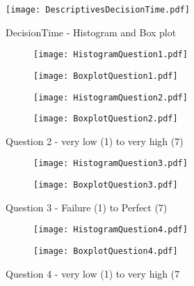 \begin{figure}[htbp] %
\begin{center} 
\texttt{[image: DescriptivesDecisionTime.pdf]}
  \caption{DecisionTime - Histogram and Box plot}
    \label{DistributionDecisionTime} 
\end{center}
\end{figure}

\begin{figure}[htbp] %
\centering
  \caption[Question 1 - Histogram and Box plot]{Question 1 - very low (1) to very high (7)}
    \label{Question1}  
\begin{subfigure} 
\centering
\texttt{[image: HistogramQuestion1.pdf]}
\end{subfigure} 
\begin{subfigure} 
\centering
\texttt{[image: BoxplotQuestion1.pdf]}
\end{subfigure}
\end{figure}
\begin{figure}[htbp] %
\begin{center} 
\begin{subfigure} 
\centering
\texttt{[image: HistogramQuestion2.pdf]}
\end{subfigure} 
\begin{subfigure} 
\centering
\texttt{[image: BoxplotQuestion2.pdf]}
\end{subfigure}
  \caption[Question 2 - Histogram and Box plot]{Question 2 - very low (1) to very high (7)}
    \label{Question2} 
\end{center}
\end{figure}
\begin{figure}[htbp] %
\begin{center} 
\begin{subfigure} 
\centering
\texttt{[image: HistogramQuestion3.pdf]}
\end{subfigure} 
\begin{subfigure} 
\centering
\texttt{[image: BoxplotQuestion3.pdf]}
\end{subfigure}
  \caption[Question 3 - Histogram and Box plot]{Question 3 - Failure (1) to Perfect (7)}
    \label{Question3} 
\end{center}
\end{figure}
\begin{figure}[htbp] %
\begin{center} 
\begin{subfigure} 
\centering
\texttt{[image: HistogramQuestion4.pdf]}
\end{subfigure} 
\begin{subfigure} 
\centering
\texttt{[image: BoxplotQuestion4.pdf]}
\end{subfigure}
  \caption[Question 4 - Histogram and Box plot]{Question 4 - very low (1) to very high (7}
    \label{Question4} 
\end{center}
\end{figure}
